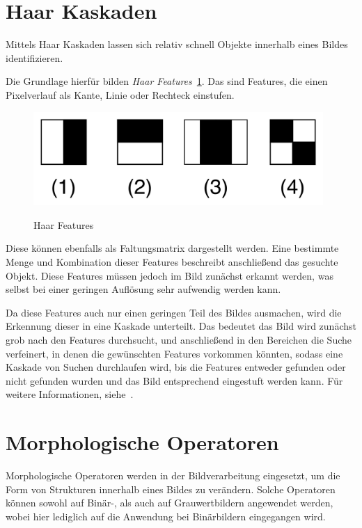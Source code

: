 \section{Haar Kaskaden} %
Mittels Haar Kaskaden lassen sich relativ schnell Objekte innerhalb eines Bildes identifizieren.

Die Grundlage hierfür bilden {\em Haar Features}~\ref{fig:Haar}.
Das sind Features, die einen Pixelverlauf als Kante, Linie oder Rechteck einstufen.

\begin{figure}[ht]
   \centering
     \includegraphics[width=11cm]{Bilder/Haar} \\
 \caption{Haar Features}
 \label{fig:Haar}
\end{figure}

Diese können ebenfalls als Faltungsmatrix dargestellt werden.
Eine bestimmte Menge und Kombination dieser Features beschreibt anschließend das gesuchte Objekt.
Diese Features müssen jedoch im Bild zunächst erkannt werden, was selbst bei einer geringen Auflösung sehr aufwendig werden kann.

Da diese Features auch nur einen geringen Teil des Bildes ausmachen, wird die Erkennung dieser in eine Kaskade unterteilt. Das bedeutet das Bild wird zunächst grob nach den Features durchsucht, und anschließend in den Bereichen die Suche verfeinert, in denen die gewünschten Features vorkommen könnten, sodass eine Kaskade von Suchen durchlaufen wird, bis die Features entweder gefunden oder nicht gefunden wurden und das Bild entsprechend eingestuft werden kann.
Für weitere Informationen, siehe~\cite{haar}.

\section{Morphologische Operatoren} %
\label{sec:MorphologischeOperatoren}
Morphologische Operatoren werden in der Bildverarbeitung eingesetzt, um die Form von Strukturen innerhalb eines Bildes zu verändern.
Solche Operatoren können sowohl auf Binär-, als auch auf Grauwertbildern angewendet werden, wobei hier lediglich auf die Anwendung bei Binärbildern
eingegangen wird.

